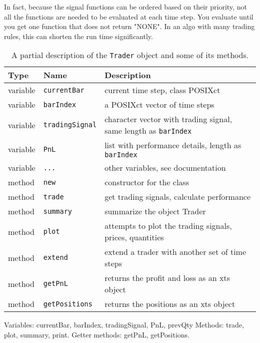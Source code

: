 \documentclass[nofootinbib]{revtex4}
\newcommand{\code}[1]{{\texttt{#1}}}
\begin{document}
In fact, because the signal functions can be ordered based on their
priority, not all the functions are needed to be evaluated at each
time step.  You evaluate until you get one function that does not
return "NONE".  In an algo with many trading rules, this can shorten
the run time significantly.


\begin{table}
  \begin{center}
    \begin{tabular}{lll}
       Type & Name & Description \\ \hline
       variable & \code{currentBar}  &  current time step, class POSIXct \\
       variable & \code{barIndex} &  a POSIXct vector of time steps  \\
       variable & \code{tradingSignal}  &  character vector with
       trading signal, same length as \code{barIndex} \\
       variable & \code{PnL}   &  list with performance details, 
         length as \code{barIndex} \\ 
       variable & \code{...} & other variables, see documentation \\
       method   & \code{new} & constructor for the class \\
       method   & \code{trade} & get trading signals, calculate performance \\
       method   & \code{summary} & summarize the object Trader \\
       method   & \code{plot} & attempts to plot the trading signals, prices, 
         quantities \\
       method & \code{extend} & extend a trader with another set of
         time steps \\
       method & \code{getPnL} & returns the profit and loss as an xts object
         \\
       method & \code{getPositions} & returns the positions as an xts object
         \\
         
       \hline
    \end{tabular}
  \end{center}
  \caption{A partial description of the \code{Trader} object and some
    of its methods.}
  \label{tab:Algo}
\end{table}  

Variables: currentBar, barIndex, tradingSignal, PnL, prevQty
Methods: trade, plot, summary, print.
Getter methods: getPnL, getPositions. 
\end{document}
